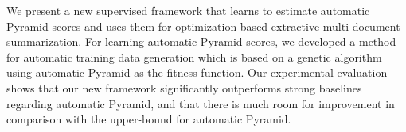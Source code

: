 We present a  new supervised framework that learns to estimate automatic Pyramid scores and uses them for optimization-based extractive multi-document summarization. For learning automatic Pyramid scores, we developed a method for automatic training data generation which is based on a genetic algorithm using automatic Pyramid as the fitness function. Our experimental evaluation shows that  our new framework significantly outperforms strong baselines regarding automatic Pyramid, and that there is much room for improvement in comparison with the upper-bound for automatic Pyramid.
